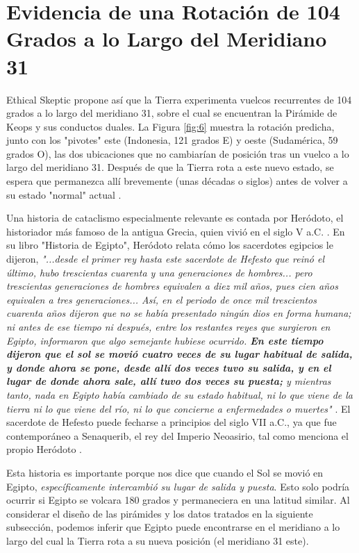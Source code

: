 \documentclass[10pt,twocolumn,letterpaper]{article}
\begin{document}
\section{Evidencia de una Rotación de 104 Grados a lo Largo del Meridiano 31}

Ethical Skeptic propone así que la Tierra experimenta vuelcos recurrentes de 104 grados a lo largo del meridiano 31, sobre el cual se encuentran la Pirámide de Keops y sus conductos duales. La Figura \ref{fig:6} muestra la rotación predicha, junto con los "pivotes" este (Indonesia, 121 grados E) y oeste (Sudamérica, 59 grados O), las dos ubicaciones que no cambiarían de posición tras un vuelco a lo largo del meridiano 31. Después de que la Tierra rota a este nuevo estado, se espera que permanezca allí brevemente (unas décadas o siglos) antes de volver a su estado "normal" actual \cite{150}.

Una historia de cataclismo especialmente relevante es contada por Heródoto, el historiador más famoso de la antigua Grecia, quien vivió en el siglo V a.C. \cite{31}. En su libro "Historia de Egipto", Heródoto relata cómo los sacerdotes egipcios le dijeron, \textit{"...desde el primer rey hasta este sacerdote de Hefesto que reinó el último, hubo trescientas cuarenta y una generaciones de hombres... pero trescientas generaciones de hombres equivalen a diez mil años, pues cien años equivalen a tres generaciones... Así, en el periodo de once mil trescientos cuarenta años dijeron que no se había presentado ningún dios en forma humana; ni antes de ese tiempo ni después, entre los restantes reyes que surgieron en Egipto, informaron que algo semejante hubiese ocurrido. \textbf{En este tiempo dijeron que el sol se movió cuatro veces de su lugar habitual de salida, y donde ahora se pone, desde allí dos veces tuvo su salida, y en el lugar de donde ahora sale, allí tuvo dos veces su puesta;} y mientras tanto, nada en Egipto había cambiado de su estado habitual, ni lo que viene de la tierra ni lo que viene del río, ni lo que concierne a enfermedades o muertes"} \cite{32}. El sacerdote de Hefesto puede fecharse a principios del siglo VII a.C., ya que fue contemporáneo a Senaquerib, el rey del Imperio Neoasirio, tal como menciona el propio Heródoto \cite{32,33,34}.

Esta historia es importante porque nos dice que cuando el Sol se movió en Egipto, \textit{específicamente intercambió su lugar de salida y puesta}. Esto solo podría ocurrir si Egipto se volcara 180 grados y permaneciera en una latitud similar. Al considerar el diseño de las pirámides y los datos tratados en la siguiente subsección, podemos inferir que Egipto puede encontrarse en el meridiano a lo largo del cual la Tierra rota a su nueva posición (el meridiano 31 este).
\end{document}

